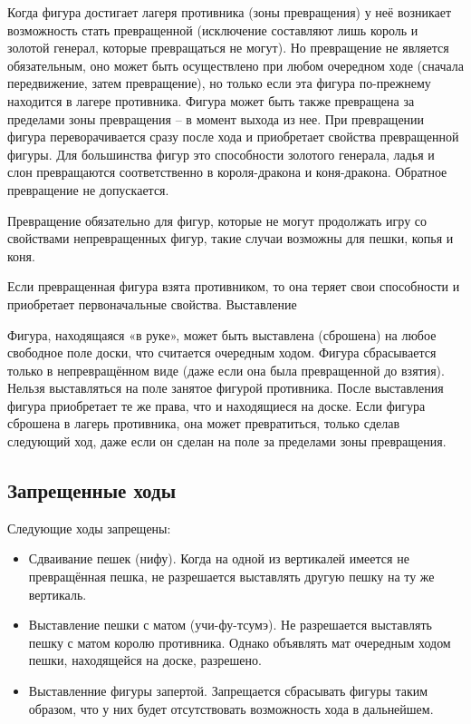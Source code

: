 Когда фигура достигает лагеря противника (зоны превращения) у неё возникает возможность стать превращенной (исключение составляют лишь король и золотой генерал, которые превращаться не могут). Но превращение не является обязательным, оно может быть осуществлено при любом очередном ходе (сначала передвижение, затем превращение), но только если эта фигура по-прежнему находится в лагере противника. Фигура может быть также превращена за пределами зоны превращения – в момент выхода из нее. При превращении фигура переворачивается сразу после хода и приобретает свойства превращенной фигуры. Для большинства фигур это способности золотого генерала, ладья и слон превращаются соответственно в короля-дракона и коня-дракона. Обратное превращение не допускается.

Превращение обязательно для фигур, которые не могут продолжать игру со свойствами непревращенных фигур, такие случаи возможны для пешки, копья и коня.

Если превращенная фигура взята противником, то она теряет свои способности и приобретает первоначальные свойства. Выставление

Фигура, находящаяся «в руке», может быть выставлена (сброшена) на любое свободное поле доски, что считается очередным ходом. Фигура сбрасывается только в непревращённом виде (даже если она была превращенной до взятия). Нельзя выставляться на поле занятое фигурой противника. После выставления фигура приобретает те же права, что и находящиеся на доске. Если фигура сброшена в лагерь противника, она может превратиться, только сделав следующий ход, даже если он сделан на поле за пределами зоны превращения.

\subsection{Запрещенные ходы}

Следующие ходы запрещены:

\begin{itemize}

	\item Сдваивание пешек (нифу). Когда на одной из вертикалей имеется не превращённая 		 пешка, не разрешается выставлять другую пешку на ту же вертикаль.
	
	\item Выставление пешки с матом (учи-фу-тсумэ). Не разрешается выставлять пешку с 			 матом королю противника. Однако объявлять мат очередным ходом пешки, находящейся на 		 доске, разрешено.
	
	\item Выставленние фигуры запертой. Запрещается сбрасывать фигуры таким образом, что у 	 них будет отсутствовать возможность хода в дальнейшем.
	
\end{itemize}

